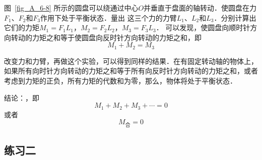 图~\ref{fig_A_6-8} 所示的圆盘可以绕通过中心$O$并垂直于盘面的轴转动．使圆盘在力$F_1$、$F_2$和$F_3$作用下处于平衡状态．量出
这三个力的力臂$L_1$、$L_2$和$L_3$．分别计算出它们的力矩$M_1 =F_1 L_1$，$M_2 =F_2 L_2$，$M_3 =F_3 L_3$．
可以发现，使圆盘向顺时针方向转动的力矩之和等于使圆盘向反时针方向转动的力矩之和，即
\[M_1+M_2=M_3\]

改变力和力臂，再做这个实验，可以得到同样的结果．在有固定转动轴的物体上，如果所有向时针方向转动的力矩之和等于所有向反时针方向转动的力矩之和，或者考虑到力矩的正负，所有力矩的代数和为零，那么，物体将处于平衡状态．

结论：，即
\[M_1+M_2+M_3+\cdots=0 \]
或者
\[M_{\text{合}}=0\]

\subsection*{练习二}

